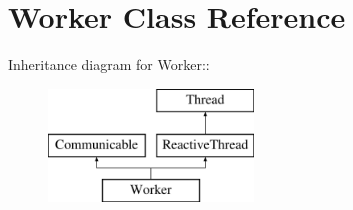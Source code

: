 \hypertarget{classWorker}{
\section{Worker Class Reference}
\label{classWorker}
}
Inheritance diagram for Worker::\begin{figure}[H]
\begin{center}
\leavevmode
\includegraphics[height=3cm]{classWorker}
\end{center}
\end{figure}
